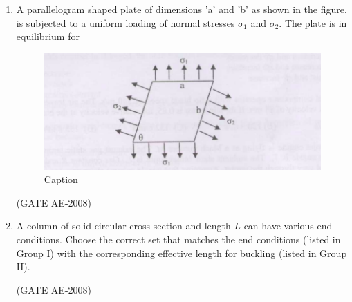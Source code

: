 \documentclass[journal,12pt,onecolumn]{IEEEtran}
\theoremstyle{remark}
\begin{document}
\begin{enumerate}
    \quad

\item A parallelogram shaped plate of dimensions 'a' and 'b' as shown in the figure, is subjected to a uniform loading of normal stresses $\sigma_1$ and $\sigma_2$. The plate is in equilibrium for 
\begin{figure}[H]
    \centering
    \includegraphics[width=0.5\linewidth]{figs/Screenshot from 2025-08-08 12-13-37.png}
    \caption{Caption}
    \label{fig:placeholder}
\end{figure}
\begin{enumerate}
\end{enumerate}
\hfill(GATE AE-2008)

    \quad

\item A column of solid circular cross-section and length $L$ can have various end conditions. Choose the correct set that matches the end conditions (listed in Group I) with the corresponding effective length for buckling (listed in Group II).

\begin{center}

\end{center}

\quad

\begin{enumerate}
\end{enumerate}
\hfill(GATE AE-2008)


\end{enumerate}
\end{document}
